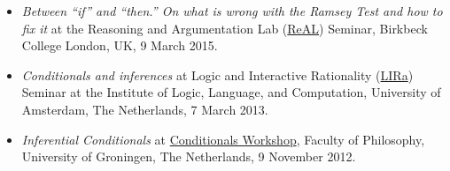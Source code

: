 \documentclass[11pt,article,oneside]{memoir}
\begin{document}
\begin{itemize}
    \item \emph{Between ``if'' and ``then.'' On what is wrong with the Ramsey Test and how to fix it} at the Reasoning and Argumentation Lab (\href{http://www.bbk.ac.uk/psychology/ral}{ReAL}) Seminar, Birkbeck College London, UK, 9 March 2015.

    \item \emph{Conditionals and inferences} at Logic and Interactive
    Rationality (\href{http://www.illc.uva.nl/lgc/seminar/}{LIRa})
    Seminar at the Institute of Logic, Language, and Computation,
    University of Amsterdam, The Netherlands, 7 March 2013.
  
    \item \emph{Inferential Conditionals} at
    \href{https://sites.google.com/site/jannekehuitink/workshop}{Conditionals Workshop}, Faculty of Philosophy, University of Groningen, The Netherlands, 9 November 2012.
  \end{itemize}
  
\end{document}
